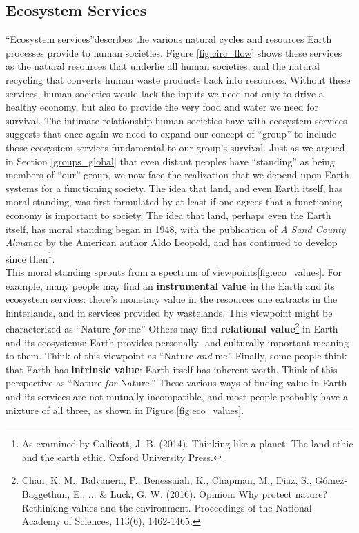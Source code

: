 \documentclass[amstex,12pt]{book}
\begin{document}
\subsection{Ecosystem Services}\label{eco_servs}
``Ecosystem services''describes the various natural cycles and resources Earth processes provide to human societies. Figure \ref{fig:circ_flow} shows these services as the natural resources that underlie all human societies, and the natural recycling that converts human waste products back into resources. Without these services, human societies would lack the inputs we need not only to drive a healthy economy, but also to provide the very food and water we need for survival. The intimate relationship human societies have with ecosystem services suggests that once again we need to expand our concept of ``group'' to include those ecosystem services fundamental to our group's survival. Just as we argued in Section \ref{groups_global} that even distant peoples have ``standing'' as being members of ``our'' group, we now face the realization that we depend upon Earth systems for a functioning society. The idea that land, and even Earth itself, has moral standing, was first formulated by at least if one agrees that a functioning economy is important to society. The idea that land, perhaps even the Earth itself, has moral standing began in 1948, with the publication of \textit{A Sand County Almanac} by the American author Aldo Leopold, and has continued to develop since then\footnote{As examined by Callicott, J. B. (2014). Thinking like a planet: The land ethic and the earth ethic. Oxford University Press.}.\\

This moral standing sprouts from a spectrum of viewpoints\ref{fig:eco_values}. For example, many people may find an \textbf{instrumental value} in the Earth and its ecosystem services: there's monetary value in the resources one extracts in the hinterlands, and in services provided by wastelands. This viewpoint might be characterized as ``Nature \emph{for} me'' Others may find \textbf{relational value}\footnote{Chan, K. M., Balvanera, P., Benessaiah, K., Chapman, M., Diaz, S., Gómez-Baggethun, E., ... \& Luck, G. W. (2016). Opinion: Why protect nature? Rethinking values and the environment. Proceedings of the National Academy of Sciences, 113(6), 1462-1465.} in Earth and its ecosystems: Earth provides personally- and culturally-important meaning to them. Think of this viewpoint as ``Nature \emph{and} me'' Finally, some people think that Earth has \textbf{intrinsic value}: Earth itself has inherent worth. Think of this perspective as ``Nature \emph{for} Nature.'' These various ways of finding value in Earth and its services are not mutually incompatible, and most people probably have a mixture of all three, as shown in Figure \ref{fig:eco_values}.\\
 
\end{document}
